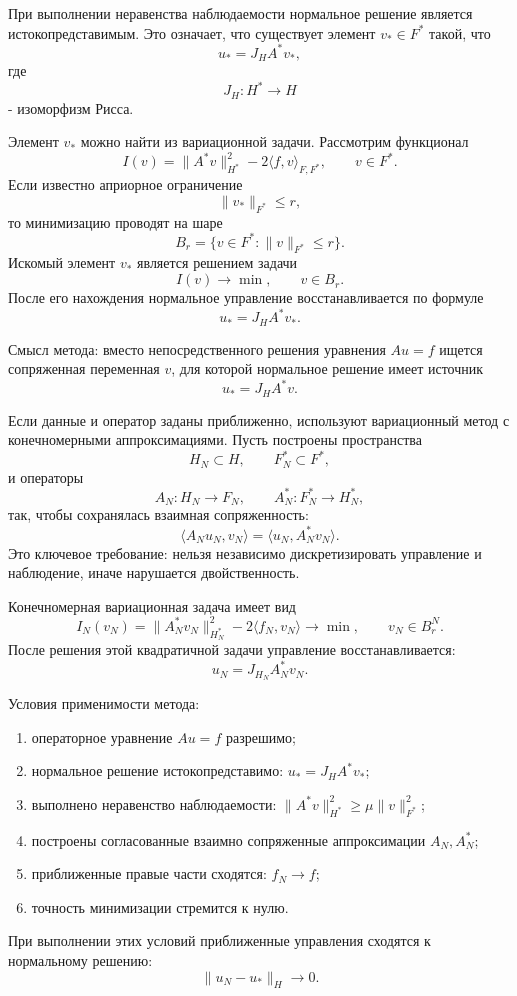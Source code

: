 \documentclass[12pt,a4paper]{article}
\begin{document}
При выполнении неравенства наблюдаемости нормальное решение является истокопредставимым. Это означает, что существует элемент $v_*\in F^*$ такой, что
\[
 u_*=J_HA^*v_*,
\]
где
\[
 J_H:H^*\to H
\]
- изоморфизм Рисса.

Элемент $v_*$ можно найти из вариационной задачи. Рассмотрим функционал
\[
 I(v)=\|A^*v\|_{H^*}^2-2\langle f,v\rangle_{F,F^*},
 \qquad v\in F^*.
\]
Если известно априорное ограничение
\[
 \|v_*\|_{F^*}\le r,
\]
то минимизацию проводят на шаре
\[
 B_r=\{v\in F^*: \|v\|_{F^*}\le r\}.
\]
Искомый элемент $v_*$ является решением задачи
\[
 I(v)\to\min,\qquad v\in B_r.
\]
После его нахождения нормальное управление восстанавливается по формуле
\[
 u_*=J_HA^*v_*.
\]

Смысл метода: вместо непосредственного решения уравнения $Au=f$ ищется сопряженная переменная $v$, для которой нормальное решение имеет источник
\[
 u_*=J_HA^*v.
\]

Если данные и оператор заданы приближенно, используют вариационный метод с конечномерными аппроксимациями. Пусть построены пространства
\[
 H_N\subset H,
 \qquad
 F_N^*\subset F^*,
\]
и операторы
\[
 A_N:H_N\to F_N,
 \qquad
 A_N^*:F_N^*\to H_N^*,
\]
так, чтобы сохранялась взаимная сопряженность:
\[
 \langle A_Nu_N,v_N\rangle=\langle u_N,A_N^*v_N\rangle.
\]
Это ключевое требование: нельзя независимо дискретизировать управление и наблюдение, иначе нарушается двойственность.

Конечномерная вариационная задача имеет вид
\[
 I_N(v_N)=\|A_N^*v_N\|_{H_N^*}^2-2\langle f_N,v_N\rangle
 \to\min,
 \qquad v_N\in B_r^N.
\]
После решения этой квадратичной задачи управление восстанавливается:
\[
 u_N=J_{H_N}A_N^*v_N.
\]

Условия применимости метода:
\begin{enumerate}
\item операторное уравнение $Au=f$ разрешимо;
\item нормальное решение истокопредставимо: $u_*=J_HA^*v_*$;
\item выполнено неравенство наблюдаемости: $\|A^*v\|_{H^*}^2\ge \mu\|v\|_{F^*}^2$;
\item построены согласованные взаимно сопряженные аппроксимации $A_N,A_N^*$;
\item приближенные правые части сходятся: $f_N\to f$;
\item точность минимизации стремится к нулю.
\end{enumerate}
При выполнении этих условий приближенные управления сходятся к нормальному решению:
\[
 \|u_N-u_*\|_H\to0.
\]
\end{document}
